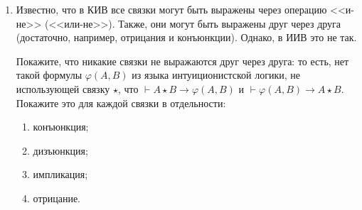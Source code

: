 \documentclass[10pt,a4paper,oneside]{article}
\begin{document}
\begin{enumerate}
\item Известно, что в КИВ все связки могут быть выражены через операцию <<и-не>> (<<или-не>>). Также, они могут быть выражены друг через
друга (достаточно, например, отрицания и конъюнкции). Однако, в ИИВ это не так.

Покажите, что никакие связки не выражаются друг через друга: то есть, нет такой формулы $\varphi(A,B)$ из языка 
интуиционистской логики, не использующей связку $\star$, что $\vdash A \star B \rightarrow \varphi(A,B)$ и $\vdash\varphi(A,B) \rightarrow A \star B$.
Покажите это для каждой связки в отдельности:
\begin{enumerate}
\item конъюнкция;
\item дизъюнкция;
\item импликация;
\item отрицание.
\end{enumerate}

\end{enumerate}
\end{document}
